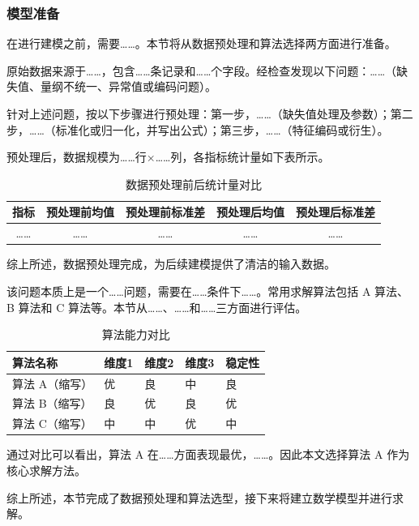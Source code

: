 
\subsubsection{模型准备}

在进行建模之前，需要……。本节将从数据预处理和算法选择两方面进行准备。

原始数据来源于……，包含……条记录和……个字段。经检查发现以下问题：……（缺失值、量纲不统一、异常值或编码问题）。

针对上述问题，按以下步骤进行预处理：第一步，……（缺失值处理及参数）；第二步，……（标准化或归一化，并写出公式）；第三步，……（特征编码或衍生）。

预处理后，数据规模为……行×……列，各指标统计量如下表所示。

\begin{table}[H]
  \centering
  \caption{数据预处理前后统计量对比}
  \begin{tabularx}{\textwidth}{CCCCC}
    \toprule
    指标 & 预处理前均值 & 预处理前标准差 & 预处理后均值 & 预处理后标准差 \\
    \midrule
    …… & …… & …… & …… & …… \\
    \bottomrule
  \end{tabularx}
  \label{tab:preprocess_compare1}
\end{table}

综上所述，数据预处理完成，为后续建模提供了清洁的输入数据。

该问题本质上是一个……问题，需要在……条件下……。常用求解算法包括 A 算法、B 算法和 C 算法等。本节从……、……和……三方面进行评估。

\begin{table}[H]
  \centering
  \caption{算法能力对比}
  \begin{tabularx}{\textwidth}{>{\hsize=2.5\hsize\centering\arraybackslash}X>{\hsize=0.6\hsize\centering\arraybackslash}X>{\hsize=0.6\hsize\centering\arraybackslash}X>{\hsize=0.6\hsize\centering\arraybackslash}X>{\hsize=0.7\hsize\centering\arraybackslash}X}
    \toprule
    算法名称 & 维度1 & 维度2 & 维度3 & 稳定性 \\
    \midrule
    算法 A（缩写） & 优 & 良 & 中 & 良 \\
    算法 B（缩写） & 良 & 优 & 良 & 优 \\
    算法 C（缩写） & 中 & 中 & 优 & 中 \\
    \bottomrule
  \end{tabularx}
  \label{tab:algorithm_compare1}
\end{table}

通过对比可以看出，算法 A 在……方面表现最优，……。因此本文选择算法 A 作为核心求解方法。

综上所述，本节完成了数据预处理和算法选型，接下来将建立数学模型并进行求解。

